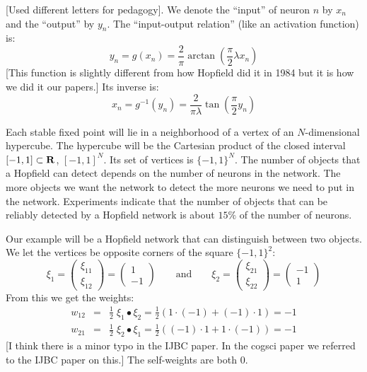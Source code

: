    [Used different letters for pedagogy].  We denote the ``input'' of neuron 
$n$ by $x_n$ and the ``output'' by $y_n$.  The ``input-output relation'' (like 
an activation function) is:
\begin{equation*}
   y_n = g(x_n) = \frac{2}{\pi} 
                        \arctan\left( \frac{\pi}{2} \lambda x_n \right)
\end{equation*}
[This function is slightly different from how Hopfield did it in 1984 but it is 
how we did it our papers.]  Its inverse is:
\begin{equation*}
   x_n = g^{-1} (y_n) = \frac{2}{\pi\lambda} 
                        \tan\left( \frac{\pi}{2} y_n \right)
\end{equation*}

   Each stable fixed point will lie in a neighborhood of a vertex of an 
$N$-dimensional hypercube.  The hypercube will be the Cartesian product of the
closed interval $[-1,1] \subset \bf{R}$, \ie $[-1,1]^N$.  Its set of vertices
is $\{-1,1\}^N$.  The number of objects that a Hopfield can detect depends on
the number of neurons in the network.  The more objects we want the network to 
detect the more neurons we need to put in the network.  Experiments indicate
that the number of objects that can be reliably detected by a Hopfield network 
is about $15\%$ of the number of neurons.

   Our example will be a Hopfield network that can distinguish between two 
objects.  We let the vertices be opposite corners of the square
$\{-1,1\}^2$:
\begin{equation*}
\xi_1 = 
\begin{pmatrix}
\xi_{11} \\ \xi_{12}
\end{pmatrix}
=
\begin{pmatrix}
1 \\ -1
\end{pmatrix}
\qquad \mathrm{and} \qquad
\xi_2 = 
\begin{pmatrix}
\xi_{21} \\ \xi_{22}
\end{pmatrix}
=
\begin{pmatrix}
-1 \\ 1
\end{pmatrix}
\end{equation*}
From this we get the weights:
\begin{eqnarray*}
      w_{12} &=& \frac{1}{2} \; \xi_1 \bullet \xi_2
              =  \frac{1}{2} (1 \cdot (-1) + (-1) \cdot 1) = -1 \\
      w_{21} &=& \frac{1}{2} \; \xi_2 \bullet \xi_1
              =  \frac{1}{2} ((-1) \cdot 1 + 1 \cdot (-1)) = -1
\end{eqnarray*}
[I think there is a minor typo in the IJBC paper.  In the cogsci paper we 
referred to the IJBC paper on this.]  The self-weights are both $0$.

